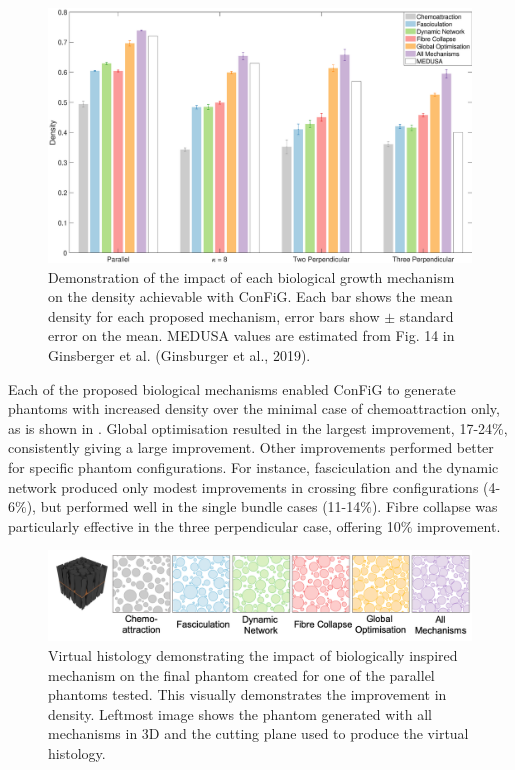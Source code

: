 \begin{figure}
  \centering
  \includegraphics[width=\textwidth]{figures/config/improvements_wfascicle_tight.eps}
  \caption[Impact of biological mechanisms in \ac{ConFiG}]{Demonstration of the impact of each biological growth mechanism on the density achievable with \ac{ConFiG}. Each bar shows the mean density for each proposed mechanism, error bars show $\pm$ standard error on the mean. MEDUSA values are estimated from Fig. 14 in Ginsberger et al. (Ginsburger et al., 2019).}
  \label{fig:config_res_improvements}
\end{figure}

Each of the proposed biological mechanisms enabled \ac{ConFiG} to generate phantoms with increased density over the minimal case of chemoattraction only, as is shown in . Global optimisation resulted in the largest improvement, 17-24\%, consistently giving a large improvement. Other improvements performed better for specific phantom configurations. For instance, fasciculation and the dynamic network produced only modest improvements in crossing fibre configurations (4-6\%), but performed well in the single bundle cases (11-14\%). Fibre collapse was particularly effective in the three perpendicular case, offering 10\% improvement.

\begin{figure}
  \centering
  \includegraphics[width=\textwidth]{figures/config/improvements_virthist.png}
  \caption[Impact of biological mechanisms on virtual histology]{Virtual histology demonstrating the impact of biologically inspired mechanism on the final phantom created for one of the parallel phantoms tested. This visually demonstrates the improvement in density. Leftmost image shows the phantom generated with all mechanisms in 3D and the cutting plane used to produce the virtual histology.  }
  \label{fig:config_res_improvements_virthist}
\end{figure}


